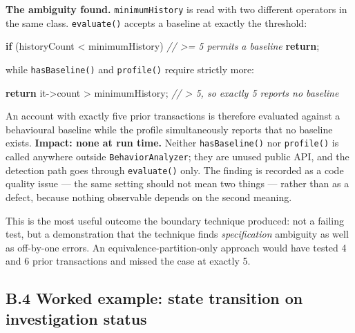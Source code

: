 \documentclass[
  12pt,
]{report}
\newenvironment{Shaded}{}{}
\newcommand{\CommentTok}[1]{\textcolor[rgb]{0.38,0.63,0.69}{\textit{#1}}}
\newcommand{\ControlFlowTok}[1]{\textcolor[rgb]{0.00,0.44,0.13}{\textbf{#1}}}
\newcommand{\NormalTok}[1]{#1}
\newcommand{\OperatorTok}[1]{\textcolor[rgb]{0.40,0.40,0.40}{#1}}
\begin{document}
\textbf{The ambiguity found.} \texttt{minimumHistory} is read with two
different operators in the same class. \texttt{evaluate()} accepts a
baseline at exactly the threshold:

\begin{Shaded}
\begin{Highlighting}[]
\ControlFlowTok{if} \OperatorTok{(}\NormalTok{historyCount }\OperatorTok{\textless{}}\NormalTok{ minimumHistory}\OperatorTok{)}   \CommentTok{// \textgreater{}= 5 permits a baseline}
    \ControlFlowTok{return}\OperatorTok{;}
\end{Highlighting}
\end{Shaded}

while \texttt{hasBaseline()} and \texttt{profile()} require strictly
more:

\begin{Shaded}
\begin{Highlighting}[]
\ControlFlowTok{return}\NormalTok{ it}\OperatorTok{{-}\textgreater{}}\NormalTok{count }\OperatorTok{\textgreater{}}\NormalTok{ minimumHistory}\OperatorTok{;}   \CommentTok{// \textgreater{} 5, so exactly 5 reports no baseline}
\end{Highlighting}
\end{Shaded}

An account with exactly five prior transactions is therefore evaluated
against a behavioural baseline while the profile simultaneously reports
that no baseline exists. \textbf{Impact: none at run time.} Neither
\texttt{hasBaseline()} nor \texttt{profile()} is called anywhere outside
\texttt{Behavior\-Analyzer}; they are unused public API, and the detection
path goes through \texttt{evaluate()} only. The finding is recorded as a
code quality issue --- the same setting should not mean two things ---
rather than as a defect, because nothing observable depends on the
second meaning.

This is the most useful outcome the boundary technique produced: not a
failing test, but a demonstration that the technique finds
\emph{specification} ambiguity as well as off-by-one errors. An
equivalence-partition-only approach would have tested 4 and 6 prior
transactions and missed the case at exactly 5.

\subsection{B.4 Worked example: state transition on investigation
status}\label{b.4-worked-example-state-transition-on-investigation-status}
\end{document}
